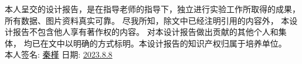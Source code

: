 


\newpage
\thispagestyle{empty}
\vspace*{20pt}
\begin{center}{}\end{center}
\par\vspace*{30pt}
\renewcommand{\baselinestretch}{2}

{%

本人呈交的设计报告，是在指导老师的指导下，独立进行实验工作所取得的成果，
所有数据、图片资料真实可靠。 尽我所知，除文中已经注明引用的内容外，
本设计报告不包含他人享有著作权的内容。
对本设计报告做出贡献的其他个人和集体，
均已在文中以明确的方式标明。本设计报告的知识产权归属于培养单位。\\[2cm]

\hspace*{1cm}本人签名: \underline{秦槿\hspace{2cm}}
\hspace{2.0cm}
日期: \underline{2023.8.8\hspace{1cm}}}
\baselineskip=23pt  %





